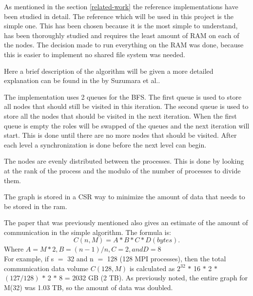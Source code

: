 As mentioned in the section \ref{related-work} the reference implementations have been studied in detail. The reference which will be used in this project is the  simple one. This has been chosen because it is the most simple to understand, has been thoroughly studied and requires the least amount of RAM on each of the nodes. The decision made to run everything on the RAM was done, because this is easier to implement no shared file system was needed. 

Here a brief description of the algorithm will be given a more detailed explanation can be found in the by Suzumara et al.\cite{suzumura2011performance}.
 
The implementation uses 2 queues for the BFS. The first queue is used to store all nodes that should still be visited in this iteration. The second queue is used to store all the nodes that should be visited in the next iteration. When the first queue is empty the roles will be swapped of the queues and the next iteration will start. This is done until there are no more nodes that should be visited.
After each level a synchronization is done before the next level can begin. 

The nodes are evenly distributed between the processes. This is done by looking at the rank of the process and the modulo of the number of processes to divide them.

The graph is stored in a CSR way to minimize the amount of data that needs to be stored in the ram.

The paper that was previously mentioned also gives an estimate of the amount of communication in the simple algorithm. The formula is:\\
\begin{equation}
\label{eq:communication_size}
C(n, M) = A * B * C * D (bytes).
\end{equation}
Where $A = M*2, B = (n-1)/n, C=2, and D=8$ \\

For example, if s $=$ 32 and n $=$ 128 (128 MPI processes), then the total communication 
data volume $C(128, M)$ is calculated as $2^{32}$ $*$ 16 $*$ 2 $*$ $(127/128)$ $*$ 2 $*$ 8 = 2032 GB (2 TB). As previously noted, the entire graph for M(32) was 
1.03 TB, so the amount of data was doubled.